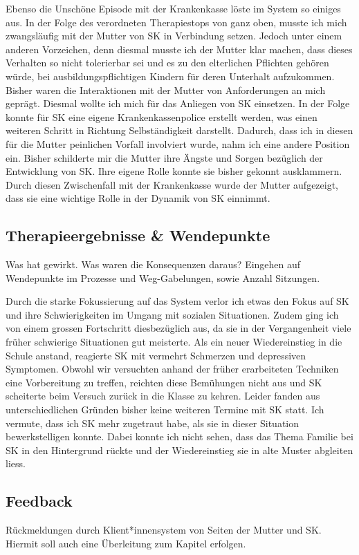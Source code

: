 Ebenso die Unschöne Episode mit der Krankenkasse löste im System so einiges aus. In der Folge des verordneten Therapiestops von ganz oben, musste ich mich zwangsläufig mit der Mutter von SK in Verbindung setzen. Jedoch unter einem anderen Vorzeichen, denn diesmal musste ich der Mutter klar machen, dass dieses Verhalten so nicht tolerierbar sei und es zu den elterlichen Pflichten gehören würde, bei ausbildungspflichtigen Kindern für deren Unterhalt aufzukommen. Bisher waren die Interaktionen mit der Mutter von Anforderungen an mich geprägt. Diesmal wollte ich mich für das Anliegen von SK einsetzen. In der Folge konnte für SK eine eigene Krankenkassenpolice erstellt werden, was einen weiteren Schritt in Richtung Selbständigkeit darstellt. Dadurch, dass ich in diesen für die Mutter peinlichen Vorfall involviert wurde, nahm ich eine andere Position ein. Bisher schilderte mir die Mutter ihre Ängste und Sorgen bezüglich der Entwicklung von SK. Ihre eigene Rolle konnte sie bisher gekonnt ausklammern. Durch diesen Zwischenfall mit der Krankenkasse wurde der Mutter aufgezeigt, dass sie eine wichtige Rolle in der Dynamik von SK einnimmt. 
 

\subsection{Therapieergebnisse \& Wendepunkte} Was hat gewirkt. Was waren die Konsequenzen daraus? Eingehen auf Wendepunkte im Prozesse und Weg-Gabelungen, sowie Anzahl Sitzungen.

Durch die starke Fokussierung auf das System verlor ich etwas den Fokus auf SK und ihre Schwierigkeiten im Umgang mit sozialen Situationen. Zudem ging ich von einem grossen Fortschritt diesbezüglich aus, da sie in der Vergangenheit viele früher schwierige Situationen gut meisterte. Als ein neuer Wiedereinstieg in die Schule anstand, reagierte SK mit vermehrt Schmerzen und depressiven Symptomen. Obwohl wir versuchten anhand der früher erarbeiteten Techniken eine Vorbereitung zu treffen, reichten diese Bemühungen nicht aus und SK scheiterte beim Versuch zurück in die Klasse zu kehren. Leider fanden aus unterschiedlichen Gründen bisher keine weiteren Termine mit SK statt. Ich vermute, dass ich SK mehr zugetraut habe, als sie in dieser Situation bewerkstelligen konnte. Dabei konnte ich nicht sehen, dass das Thema Familie bei SK in den Hintergrund rückte und der Wiedereinstieg sie in alte Muster abgleiten liess. 


\subsection{Feedback} Rückmeldungen durch Klient*innensystem von Seiten der Mutter und SK. Hiermit soll auch eine Überleitung zum Kapitel  erfolgen.